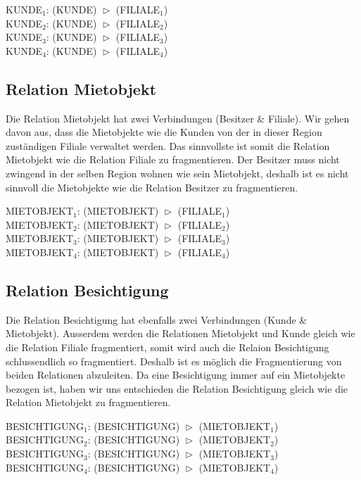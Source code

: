 \documentclass[11pt,a4paper,parskip=half]{scrartcl}
\begin{document}
KUNDE$_1$: (KUNDE)  $\vartriangleright$ (FILIALE$_1$)\\
KUNDE$_2$: (KUNDE)  $\vartriangleright$ (FILIALE$_2$)\\
KUNDE$_3$: (KUNDE)  $\vartriangleright$ (FILIALE$_3$)\\
KUNDE$_4$: (KUNDE)  $\vartriangleright$ (FILIALE$_4$)

\subsection{Relation Mietobjekt}
Die Relation Mietobjekt hat zwei Verbindungen (Besitzer \& Filiale). Wir gehen davon aus, dass die Mietobjekte wie die Kunden von der in dieser Region zuständigen Filiale verwaltet werden. Das sinnvollste ist somit die Relation Mietobjekt wie die Relation Filiale zu fragmentieren. Der Besitzer muss nicht zwingend in der selben Region wohnen wie sein Mietobjekt, deshalb ist es nicht sinnvoll die Mietobjekte wie die Relation Besitzer zu fragmentieren.

MIETOBJEKT$_1$: (MIETOBJEKT) $\vartriangleright$ (FILIALE$_1$)\\
MIETOBJEKT$_2$: (MIETOBJEKT) $\vartriangleright$ (FILIALE$_2$)\\
MIETOBJEKT$_3$: (MIETOBJEKT) $\vartriangleright$ (FILIALE$_3$)\\
MIETOBJEKT$_4$: (MIETOBJEKT) $\vartriangleright$ (FILIALE$_4$)

\subsection{Relation Besichtigung}
Die Relation Besichtigung hat ebenfalls zwei Verbindungen (Kunde \& Mietobjekt). Ausserdem werden die Relationen Mietobjekt und Kunde gleich wie die Relation Filiale fragmentiert, somit wird auch die Relaion Besichtigung schlussendlich so fragmentiert. Deshalb ist es möglich die Fragmentierung von beiden Relationen abzuleiten. Da eine Besichtigung immer auf ein Mietobjekte bezogen ist, haben wir uns entschieden die Relation Besichtigung gleich wie die Relation Mietobjekt zu fragmentieren.

BESICHTIGUNG$_1$: (BESICHTIGUNG) $\vartriangleright$ (MIETOBJEKT$_1$)\\
BESICHTIGUNG$_2$: (BESICHTIGUNG) $\vartriangleright$ (MIETOBJEKT$_2$)\\
BESICHTIGUNG$_3$: (BESICHTIGUNG) $\vartriangleright$ (MIETOBJEKT$_3$)\\
BESICHTIGUNG$_4$: (BESICHTIGUNG) $\vartriangleright$ (MIETOBJEKT$_4$)
\end{document}
